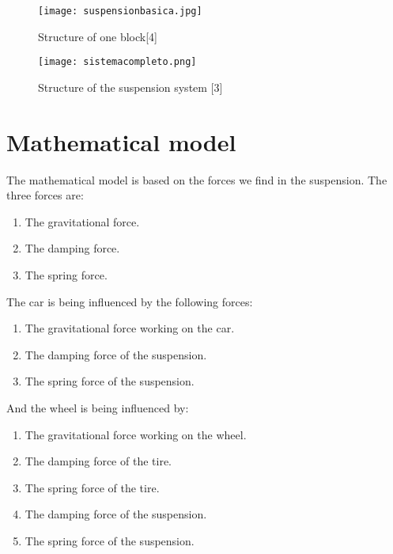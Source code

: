 \documentclass[a4paper]{article}
\begin{document}
\begin{figure}[H]
\centering
\texttt{[image: suspensionbasica.jpg]}
\caption{\label{fig:suspensionbasica}Structure of one block[4]}
\end{figure}


\begin{figure}[H]
\centering
\texttt{[image: sistemacompleto.png]}
\caption{\label{fig:sistemacompleto}Structure of the suspension system [3]}
\end{figure}



\newpage



\section{Mathematical model}

The mathematical model is based on the forces we find in the suspension.
The three forces are:
\begin{enumerate}
	\item The gravitational force.
	\item The damping force.
	\item The spring force.\\
\end{enumerate}

The car is being influenced by the following forces:
\begin{enumerate}
	\item The gravitational force working on the car.
	\item The damping force of the suspension.
	\item The spring force of the suspension.\\
\end{enumerate}

And the wheel is being influenced by:
\begin{enumerate}
	\item The gravitational force working on the wheel.
	\item The damping force of the tire.
	\item The spring force of the tire.
	\item The damping force of the suspension.
	\item The spring force of the suspension.\\
\end{enumerate}
\end{document}
